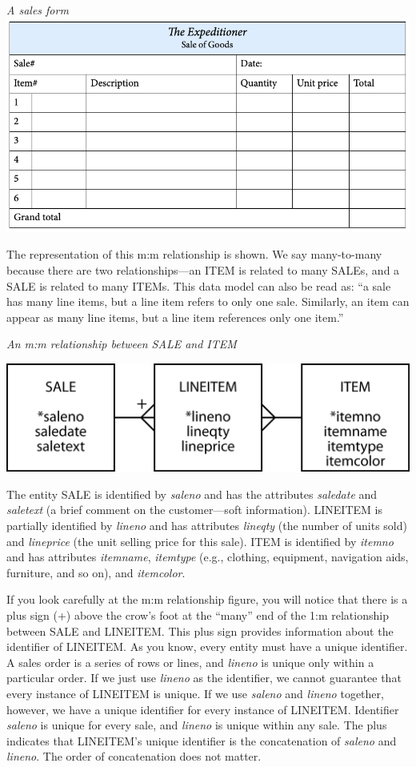 \documentclass[
]{article}
\begin{document}
\emph{A sales form} \includegraphics{Figures/Chapter 5/sales form.png}

The representation of this m:m relationship is shown. We say
many-to-many because there are two relationships---an ITEM is related to
many SALEs, and a SALE is related to many ITEMs. This data model can
also be read as: ``a sale has many line items, but a line item refers to
only one sale. Similarly, an item can appear as many line items, but a
line item references only one item.''

\emph{An m:m relationship between SALE and ITEM}

\includegraphics[width=5.89583in,height=\textheight]{Figures/Chapter 5/sale-item.png}

The entity SALE is identified by \emph{saleno} and has the attributes
\emph{saledate} and \emph{saletext} (a brief comment on the
customer---soft information). LINEITEM is partially identified by
\emph{lineno} and has attributes \emph{lineqty} (the number of units
sold) and \emph{lineprice} (the unit selling price for this sale). ITEM
is identified by \emph{itemno} and has attributes \emph{itemname},
\emph{itemtype} (e.g., clothing, equipment, navigation aids, furniture,
and so on), and \emph{itemcolor}.

If you look carefully at the m:m relationship figure, you will notice
that there is a plus sign (+) above the crow's foot at the ``many'' end
of the 1:m relationship between SALE and LINEITEM. This plus sign
provides information about the identifier of LINEITEM. As you know,
every entity must have a unique identifier. A sales order is a series of
rows or lines, and \emph{lineno} is unique only within a particular
order. If we just use \emph{lineno} as the identifier, we cannot
guarantee that every instance of LINEITEM is unique. If we use
\emph{saleno} and \emph{lineno} together, however, we have a unique
identifier for every instance of LINEITEM. Identifier \emph{saleno} is
unique for every sale, and \emph{lineno} is unique within any sale. The
plus indicates that LINEITEM's unique identifier is the concatenation of
\emph{saleno} and \emph{lineno}. The order of concatenation does not
matter.
\end{document}
